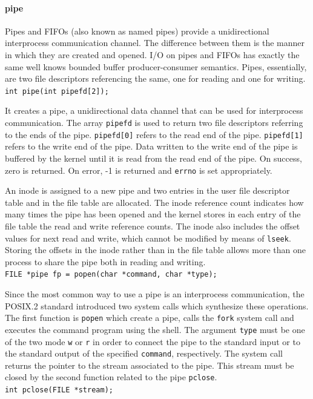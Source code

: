 \paragraph{pipe}
Pipes and FIFOs (also known as named pipes) provide a unidirectional interprocess communication channel. The difference between them is the manner in which they are created and opened. I/O on pipes and FIFOs has exactly the same well knows bounded buffer producer-consumer semantics. Pipes, essentially, are two file descriptors referencing the same, one for reading and one for writing.
\\
\texttt{int pipe(int pipefd[2]);}

It creates a pipe, a unidirectional data channel that can be used for interprocess communication. The array \texttt{pipefd} is used to return two file descriptors referring to the ends of the pipe. \texttt{pipefd[0]} refers to the read end of the pipe. \texttt{pipefd[1]} refers to the write end of the pipe. Data written to the write end of the pipe is buffered by the kernel until it is read from the read end of the pipe. On success, zero is returned. On error, -1 is returned and \texttt{errno} is set appropriately.

An inode is assigned to a new pipe and two entries in the user file descriptor table and in the file table are allocated. The inode reference count indicates how many times the pipe has been opened and the kernel stores in each entry of the file table the read and write reference counts. The inode also includes the offset values for next read and write, which cannot be modified by means of \texttt{lseek}. Storing the offsets in the inode rather than in the file table allows more than one process to share the pipe both in reading and writing.
\\
\texttt{FILE *pipe fp = popen(char *command, char *type);}

Since the most common way to use a pipe is an interprocess communication, the POSIX.2 standard introduced two system calls which synthesize these operations. The first function is \texttt{popen} which create a pipe, calls the \texttt{fork} system call and executes the command program using the shell. The argument \texttt{type} must be one of the two mode \texttt{w} or \texttt{r} in order to connect the pipe to the standard input or to the standard output of the specified \texttt{command}, respectively. The system call returns the pointer to the stream associated to the pipe. This stream must be closed by the second function related to the pipe \texttt{pclose}.
\\
\texttt{int pclose(FILE *stream);}

